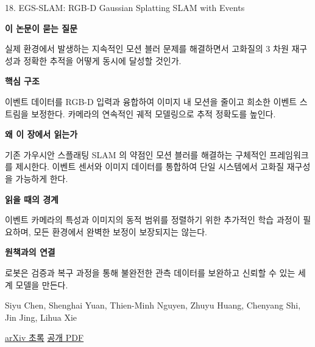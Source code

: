 \documentclass[11pt,openany]{book}
\begin{document}
\begin{termcard}{18. EGS-SLAM: RGB-D Gaussian Splatting SLAM with Events}

\par

\medskip

{\sffamily\bfseries\color{deepblue} 이 논문이 묻는 질문}\par

실제 환경에서 발생하는 지속적인 모션 블러 문제를 해결하면서 고화질의 3 차원 재구성과 정확한 추적을 어떻게 동시에 달성할 것인가.

\smallskip

{\sffamily\bfseries\color{deepblue} 핵심 구조}\par

이벤트 데이터를 RGB-D 입력과 융합하여 이미지 내 모션을 줄이고 희소한 이벤트 스트림을 보정한다. 카메라의 연속적인 궤적 모델링으로 추적 정확도를 높인다.

\smallskip

{\sffamily\bfseries\color{deepblue} 왜 이 장에서 읽는가}\par

기존 가우시안 스플래팅 SLAM 의 약점인 모션 블러를 해결하는 구체적인 프레임워크를 제시한다. 이벤트 센서와 이미지 데이터를 통합하여 단일 시스템에서 고화질 재구성을 가능하게 한다.

\smallskip

{\sffamily\bfseries\color{coral} 읽을 때의 경계}\par

이벤트 카메라의 특성과 이미지의 동적 범위를 정렬하기 위한 추가적인 학습 과정이 필요하며, 모든 환경에서 완벽한 보정이 보장되지는 않는다.

\smallskip

{\sffamily\bfseries\color{teal} 원책과의 연결}\par

로봇은 검증과 복구 과정을 통해 불완전한 관측 데이터를 보완하고 신뢰할 수 있는 세계 모델을 만든다.

\medskip

{\footnotesize\color{muted} Siyu Chen, Shenghai Yuan, Thien-Minh Nguyen, Zhuyu Huang, Chenyang Shi, Jin Jing, Lihua Xie\par

\href{https://arxiv.org/abs/2508.07003}{arXiv 초록} \quad \href{https://arxiv.org/pdf/2508.07003}{공개 PDF}\par}

\end{termcard}
\end{document}
